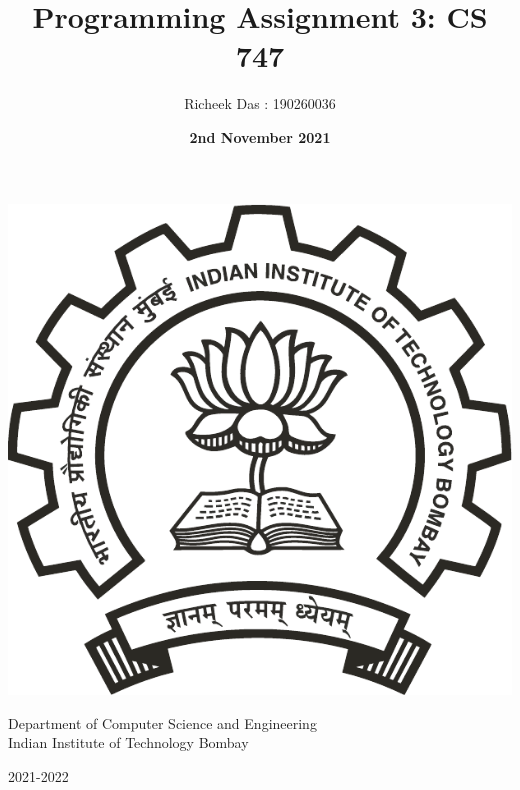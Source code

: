 \documentclass[11pt]{article}
\title{\huge Programming Assignment 3: CS 747}
\author{\Large Richeek Das : 190260036}
\date{\textbf{2nd November 2021}}
\begin{document}
    
    \maketitle
    
    \pagestyle{fancy}
    \fancyhf{}
    \renewcommand{\footrulewidth}{1pt}
    
    \renewcommand{\labelenumi}{(\alph{enumi})}
    \renewcommand{\labelenumii}{(\arabic{enumii})}
    
    \tableofcontents{}
    
    \vfill
    
    \begin{center}
        \includegraphics[scale=0.30]{iitb.pdf}
  
        \vspace{0.5cm}
        {\normalsize
            Department of Computer Science and Engineering \\
            Indian Institute of Technology Bombay  \par}
        
        {\normalsize 2021-2022 \par}
        \vspace{0.5cm}
    \end{center}
    
\end{document}
